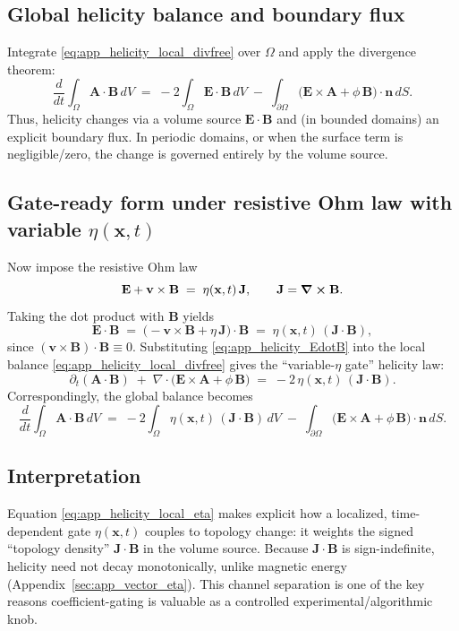 \documentclass[11pt]{article}
\theoremstyle{plain}
\theoremstyle{definition}
\theoremstyle{remark}
\newcommand{\diver}{\nabla\cdot}
\newcommand{\A}{\mathbf{A}}
\newcommand{\B}{\mathbf{B}}
\newcommand{\E}{\mathbf{E}}
\newcommand{\J}{\mathbf{J}}
\newcommand{\vfield}{\mathbf{v}}
\begin{document}
\subsection{Global helicity balance and boundary flux}
Integrate \eqref{eq:app_helicity_local_divfree} over $\Omega$ and apply the divergence theorem:
\begin{equation}\label{eq:app_helicity_global}
  \frac{d}{dt}\int_{\Omega}\A\cdot\B\,dV
  \;=\;
  -2\int_{\Omega}\E\cdot\B\,dV
  \;-\;
  \int_{\partial\Omega}\Big(\E\times\A + \phi\,\B\Big)\cdot\mathbf{n}\,dS.
\end{equation}
Thus, helicity changes via a volume source $\E\cdot\B$ and (in bounded domains) an explicit boundary
flux. In periodic domains, or when the surface term is negligible/zero, the change is governed entirely
by the volume source.

\subsection{Gate-ready form under resistive Ohm law with variable $\eta(\mathbf{x},t)$}
Now impose the resistive Ohm law
\begin{equation}\label{eq:app_helicity_ohm}
  \E + \vfield\times\B \;=\; \eta(\mathbf{x},t)\,\J,
  \qquad \J=\curl\B.
\end{equation}
Taking the dot product with $\B$ yields
\begin{equation}\label{eq:app_helicity_EdotB}
  \E\cdot\B
  \;=\;
  \big(-\vfield\times\B + \eta\,\J\big)\cdot\B
  \;=\;
  \eta(\mathbf{x},t)\,(\J\cdot\B),
\end{equation}
since $(\vfield\times\B)\cdot\B\equiv 0$. Substituting \eqref{eq:app_helicity_EdotB} into the local
balance \eqref{eq:app_helicity_local_divfree} gives the ``variable-$\eta$ gate'' helicity law:
\begin{equation}\label{eq:app_helicity_local_eta}
  \partial_t(\A\cdot\B)
  \;+\;
  \diver\!\Big(\E\times\A + \phi\,\B\Big)
  \;=\;
  -2\,\eta(\mathbf{x},t)\,(\J\cdot\B).
\end{equation}
Correspondingly, the global balance becomes
\begin{equation}\label{eq:app_helicity_global_eta}
  \frac{d}{dt}\int_{\Omega}\A\cdot\B\,dV
  \;=\;
  -2\int_{\Omega}\eta(\mathbf{x},t)\,(\J\cdot\B)\,dV
  \;-\;
  \int_{\partial\Omega}\Big(\E\times\A + \phi\,\B\Big)\cdot\mathbf{n}\,dS.
\end{equation}

\subsection{Interpretation}
Equation \eqref{eq:app_helicity_local_eta} makes explicit how a localized, time-dependent gate
$\eta(\mathbf{x},t)$ couples to topology change: it weights the signed ``topology density'' $\J\cdot\B$
in the volume source. Because $\J\cdot\B$ is sign-indefinite, helicity need not decay monotonically,
unlike magnetic energy (Appendix~\ref{sec:app_vector_eta}). This channel separation is one of the key
reasons coefficient-gating is valuable as a controlled experimental/algorithmic knob.
\end{document}
